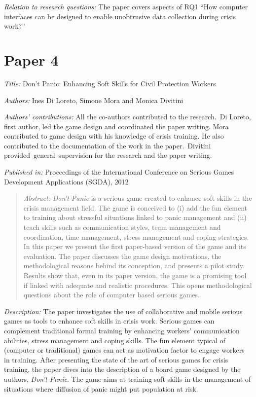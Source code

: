 \emph{Relation to research questions:} The paper covers aspects of RQ1 ``How computer interfaces can be designed to enable unobtrusive data collection during crisis work?''

\section[Don't Panic: Enhancing Soft Skills for Civil Protection Workers]{Paper 4}\label{paper-4}

\emph{Title:} Don't Panic: Enhancing Soft Skills for Civil Protection Workers

\emph{Authors:} Ines Di Loreto, Simone Mora and Monica Divitini

\emph{Authors' contributions:} All the co-authors contributed to the research.~Di Loreto, first author, led the game design and coordinated the paper writing. Mora contributed to game design with his knowledge of crisis training. He also contributed to the documentation of the work in the paper.~Divitini provided~general~supervision for the research and the paper writing.

\emph{Published in:} Proceedings of the International Conference on Serious Games Development Applications (SGDA), 2012
\begin{quote}
	\emph{Abstract:} \emph{Don't Panic} is a serious game created to enhance soft skills in the crisis management field. The game is conceived to (i) add the fun element to training about stressful situations linked to panic management and (ii) teach skills such as communication styles, team management and coordination, time management, stress management and coping strategies. In this paper we present the first paper-based version of the game and its evaluation. The paper discusses the game design motivations, the methodological reasons behind its conception, and presents a pilot study. Results show that, even in its paper version, the game is a promising tool if linked with adequate and realistic procedures. This opens methodological questions about the role of computer based serious games. 
\end{quote}

\emph{Description:} The paper investigates the use of collaborative and mobile serious games as tools to enhance soft skills in crisis work. Serious games can complement traditional formal training by enhancing workers' communication abilities, stress management and coping skills. The fun element typical of (computer or traditional) games can act as motivation factor to engage workers in training. After presenting the state of the art of serious games for crisis training, the paper dives into the description of a board game designed by the authors, \emph{Don't Panic}. The game aims at training soft skills in the management of situations where diffusion of panic might put population at risk.

